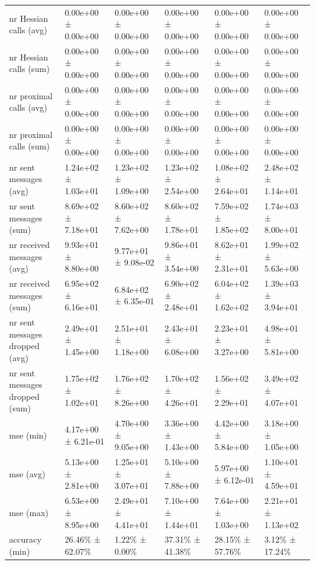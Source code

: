 \begin{tabular}{llllll}
 nr Hessian calls (avg)             & 0.00e+00 ± 0.00e+00 & 0.00e+00 ± 0.00e+00 & 0.00e+00 ± 0.00e+00 & 0.00e+00 ± 0.00e+00 & 0.00e+00 ± 0.00e+00 \\
 nr Hessian calls (sum)             & 0.00e+00 ± 0.00e+00 & 0.00e+00 ± 0.00e+00 & 0.00e+00 ± 0.00e+00 & 0.00e+00 ± 0.00e+00 & 0.00e+00 ± 0.00e+00 \\
 nr proximal calls (avg)            & 0.00e+00 ± 0.00e+00 & 0.00e+00 ± 0.00e+00 & 0.00e+00 ± 0.00e+00 & 0.00e+00 ± 0.00e+00 & 0.00e+00 ± 0.00e+00 \\
 nr proximal calls (sum)            & 0.00e+00 ± 0.00e+00 & 0.00e+00 ± 0.00e+00 & 0.00e+00 ± 0.00e+00 & 0.00e+00 ± 0.00e+00 & 0.00e+00 ± 0.00e+00 \\
 nr sent messages (avg)             & 1.24e+02 ± 1.03e+01 & 1.23e+02 ± 1.09e+00 & 1.23e+02 ± 2.54e+00 & 1.08e+02 ± 2.64e+01 & 2.48e+02 ± 1.14e+01 \\
 nr sent messages (sum)             & 8.69e+02 ± 7.18e+01 & 8.60e+02 ± 7.62e+00 & 8.60e+02 ± 1.78e+01 & 7.59e+02 ± 1.85e+02 & 1.74e+03 ± 8.00e+01 \\
 nr received messages (avg)         & 9.93e+01 ± 8.80e+00 & 9.77e+01 ± 9.08e-02 & 9.86e+01 ± 3.54e+00 & 8.62e+01 ± 2.31e+01 & 1.99e+02 ± 5.63e+00 \\
 nr received messages (sum)         & 6.95e+02 ± 6.16e+01 & 6.84e+02 ± 6.35e-01 & 6.90e+02 ± 2.48e+01 & 6.04e+02 ± 1.62e+02 & 1.39e+03 ± 3.94e+01 \\
 nr sent messages dropped (avg)     & 2.49e+01 ± 1.45e+00 & 2.51e+01 ± 1.18e+00 & 2.43e+01 ± 6.08e+00 & 2.23e+01 ± 3.27e+00 & 4.98e+01 ± 5.81e+00 \\
 nr sent messages dropped (sum)     & 1.75e+02 ± 1.02e+01 & 1.76e+02 ± 8.26e+00 & 1.70e+02 ± 4.26e+01 & 1.56e+02 ± 2.29e+01 & 3.49e+02 ± 4.07e+01 \\
 mse (min)                          & 4.17e+00 ± 6.21e-01 & 4.70e+00 ± 9.05e+00 & 3.36e+00 ± 1.43e+00 & 4.42e+00 ± 5.84e+00 & 3.18e+00 ± 1.05e+00 \\
 mse (avg)                          & 5.13e+00 ± 2.81e+00 & 1.25e+01 ± 3.07e+01 & 5.10e+00 ± 7.88e+00 & 5.97e+00 ± 6.12e-01 & 1.10e+01 ± 4.59e+01 \\
 mse (max)                          & 6.53e+00 ± 8.95e+00 & 2.49e+01 ± 4.41e+01 & 7.10e+00 ± 1.44e+01 & 7.64e+00 ± 1.03e+00 & 2.21e+01 ± 1.13e+02 \\
 accuracy (min)                     & 26.46\% ± 62.07\%     & 1.22\% ± 0.00\%       & 37.31\% ± 41.38\%     & 28.15\% ± 57.76\%     & 3.12\% ± 17.24\%      \\

\end{tabular}
